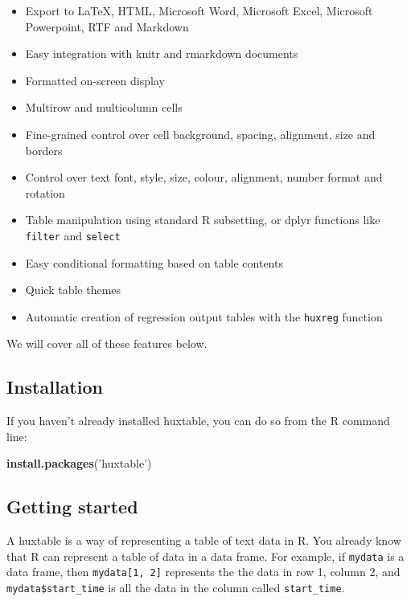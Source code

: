 \documentclass[]{article}
\newenvironment{Shaded}{\begin{snugshade}}{\end{snugshade}}
\newcommand{\KeywordTok}[1]{\textcolor[rgb]{0.13,0.29,0.53}{\textbf{#1}}}
\newcommand{\StringTok}[1]{\textcolor[rgb]{0.31,0.60,0.02}{#1}}
\newcommand{\NormalTok}[1]{#1}
\providecommand{\tightlist}{%
  \setlength{\itemsep}{0pt}\setlength{\parskip}{0pt}}
\begin{document}
\begin{itemize}
\tightlist
\item
  Export to LaTeX, HTML, Microsoft Word, Microsoft Excel, Microsoft
  Powerpoint, RTF and Markdown
\item
  Easy integration with knitr and rmarkdown documents
\item
  Formatted on-screen display
\item
  Multirow and multicolumn cells
\item
  Fine-grained control over cell background, spacing, alignment, size
  and borders
\item
  Control over text font, style, size, colour, alignment, number format
  and rotation
\item
  Table manipulation using standard R subsetting, or dplyr functions
  like \texttt{filter} and \texttt{select}
\item
  Easy conditional formatting based on table contents
\item
  Quick table themes
\item
  Automatic creation of regression output tables with the
  \texttt{huxreg} function
\end{itemize}

We will cover all of these features below.

\subsection{Installation}\label{installation}

If you haven't already installed huxtable, you can do so from the R
command line:

\begin{Shaded}
\begin{Highlighting}[]
\KeywordTok{install.packages}\NormalTok{(}\StringTok{'huxtable'}\NormalTok{)}
\end{Highlighting}
\end{Shaded}

\FloatBarrier

\subsection{Getting started}\label{getting-started}

A huxtable is a way of representing a table of text data in R. You
already know that R can represent a table of data in a data frame. For
example, if \texttt{mydata} is a data frame, then
\texttt{mydata{[}1,\ 2{]}} represents the the data in row 1, column 2,
and \texttt{mydata\$start\_time} is all the data in the column called
\texttt{start\_time}.
\end{document}
